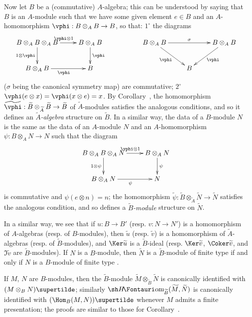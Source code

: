 \begin{env}[1.3.13]
\label{I.1.3.13}
Now let $B$ be a (commutative) $A$-algebra; this can be understood by saying that $B$ is an $A$-module such that we have some given element $e\in B$ and an $A$-homomorphism $\vphi:B\otimes_A B\to B$, so that: $1^\circ$ the diagrams
\[
  \xymatrix{
    B\otimes_A B\otimes_A B\ar[r]^{\vphi\otimes 1}\ar[d]_{1\otimes\vphi} &
    B\otimes_A B\ar[d]^\vphi & &
    B\otimes_A B\ar[rr]^\sigma\ar[rd]_\vphi & &
    B\otimes_A B\ar[dl]^\vphi\\
    B\otimes_A B\ar[r]_\vphi &
    B & & &
    B
  }
\]
($\sigma$ being the canonical symmetry map) are commutative; $2^\circ$ $\vphi(e\otimes x)=\vphi(x\otimes e)=x$.
By Corollary~, the homomorphism $\widetilde{\vphi}:\widetilde{B}\otimes_{\widetilde{A}}\widetilde{B}\to\widetilde{B}$ of $\widetilde{A}$-modules satisfies the analogous conditions, and so it defines an \emph{$\widetilde{A}$-algebra} structure on $\widetilde{B}$.
In a similar way, the data of a $B$-module $N$ is the same as the data of an $A$-module $N$ and an $A$-homomorphism $\psi:B\otimes_A N\to N$ such that the diagram
\[
  \xymatrix{
    B\otimes_A B\otimes_A N\ar[r]^{\vphi\otimes 1}\ar[d]_{1\otimes\psi} &
    B\otimes_A N\ar[d]^\psi\\
    B\otimes_A N\ar[r]_\psi &
    N
  }
\]
is commutative and $\psi(e\otimes n)=n$;
the homomorphism $\widetilde{\psi}:\widetilde{B}\otimes_{\widetilde{A}}\widetilde{N}\to\widetilde{N}$ satisfies the analogous condition, and so defines a \emph{$\widetilde{B}$-module} structure on $\widetilde{N}$.

In a similar way, we see that if $u:B\to B'$ (resp. $v:N\to N'$) is a homomorphism of $A$-algebras (resp. of $B$-modules), then $\widetilde{u}$ (resp. $\widetilde{v}$) is a homomorphism of $\widetilde{A}$-algebras (resp. of $\widetilde{B}$-modules), and $\Ker\widetilde{u}$ is a $\widetilde{B}$-ideal (resp. $\Ker\widetilde{v}$, $\Coker\widetilde{v}$, and $\Im\widetilde{v}$ are $\widetilde{B}$-modules).
If $N$ is a $B$-module, then $\widetilde{N}$ is a $\widetilde{B}$-module of finite type if and only if $N$ is a $B$-module of finite type .

If $M$, $N$ are $B$-modules, then the $\widetilde{B}$-module $\widetilde{M}\otimes_{\widetilde{B}}\widetilde{N}$ is canonically identified with $(M\otimes_B N)\supertilde$;
similarly $\shHom_{\widetilde{B}}(\widetilde{M},\widetilde{N})$ is canonically identified with $(\Hom_B(M,N))\supertilde$ whenever $M$ admits a finite presentation;
the proofs are similar to those for Corollary~.


\end{env}
